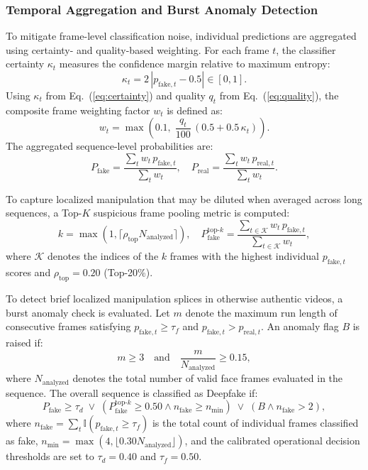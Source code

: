 \documentclass[conference]{IEEEtran}
\begin{document}
\subsubsection{Temporal Aggregation and Burst Anomaly Detection}
To mitigate frame-level classification noise, individual predictions are aggregated using certainty- and quality-based weighting. For each frame $t$, the classifier certainty $\kappa_t$ measures the confidence margin relative to maximum entropy:
\begin{equation}
\kappa_t = 2\,|p_{\text{fake}, t} - 0.5| \in [0, 1].
\label{eq:certainty}
\end{equation}
Using $\kappa_t$ from Eq.~(\ref{eq:certainty}) and quality $q_t$ from Eq.~(\ref{eq:quality}), the composite frame weighting factor $w_t$ is defined as:
\begin{equation}
w_t = \max\!\left(0.1, \; \frac{q_t}{100}\,(0.5 + 0.5\,\kappa_t)\right).
\label{eq:weight}
\end{equation}
The aggregated sequence-level probabilities are:
\begin{equation}
P_{\text{fake}} = \frac{\sum_t w_t \, p_{\text{fake}, t}}{\sum_t w_t}, \quad
P_{\text{real}} = \frac{\sum_t w_t \, p_{\text{real}, t}}{\sum_t w_t}.
\label{eq:video}
\end{equation}

To capture localized manipulation that may be diluted when averaged across long sequences, a Top-$K$ suspicious frame pooling metric is computed:
\begin{equation}
k = \max(1, \lceil \rho_{\text{top}} N_{\text{analyzed}} \rceil), \quad
P_{\text{fake}}^{\text{top-}k} = \frac{\sum_{t \in \mathcal{K}} w_t \, p_{\text{fake}, t}}{\sum_{t \in \mathcal{K}} w_t},
\label{eq:topk}
\end{equation}
where $\mathcal{K}$ denotes the indices of the $k$ frames with the highest individual $p_{\text{fake}, t}$ scores and $\rho_{\text{top}} = 0.20$ (Top-20\%).

To detect brief localized manipulation splices in otherwise authentic videos, a burst anomaly check is evaluated. Let $m$ denote the maximum run length of consecutive frames satisfying $p_{\text{fake}, t} \ge \tau_f$ and $p_{\text{fake}, t} > p_{\text{real}, t}$. An anomaly flag $B$ is raised if:
\begin{equation}
m \ge 3 \quad \text{and} \quad \frac{m}{N_{\text{analyzed}}} \ge 0.15,
\label{eq:burst}
\end{equation}
where $N_{\text{analyzed}}$ denotes the total number of valid face frames evaluated in the sequence. The overall sequence is classified as Deepfake if:
\begin{equation}
P_{\text{fake}} \ge \tau_d \;\lor\; (P_{\text{fake}}^{\text{top-}k} \ge 0.50 \land n_{\text{fake}} \ge n_{\text{min}}) \;\lor\; (B \land n_{\text{fake}} > 2),
\label{eq:decision}
\end{equation}
where $n_{\text{fake}} = \sum_t \mathbb{I}(p_{\text{fake}, t} \ge \tau_f)$ is the total count of individual frames classified as fake, $n_{\text{min}} = \max(4, \lfloor 0.30 N_{\text{analyzed}} \rfloor)$, and the calibrated operational decision thresholds are set to $\tau_d = 0.40$ and $\tau_f = 0.50$. 
\end{document}
